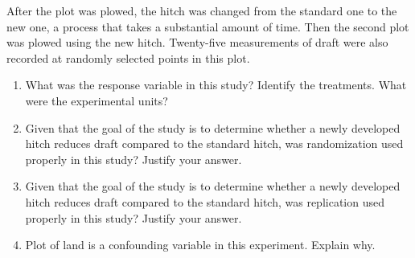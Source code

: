 \documentclass[a4paper,12pt,twoside]{book}
\begin{document}
\begin{enumerate}
After the plot was plowed, the hitch was changed from the standard one to the new one, a process that takes a substantial amount of time. Then the second plot was plowed using the new hitch. Twenty-five measurements of draft were also recorded at randomly selected points in this plot.

     \begin{enumerate}[label = (\alph*)]
        \item What was the response variable in this study? Identify the treatments. What were the experimental units?
        \item  Given that the goal of the study is to determine whether a newly developed hitch reduces draft compared to the standard hitch, was randomization used properly in this study? Justify your answer.
        \item Given that the goal of the study is to determine whether a newly developed hitch reduces draft compared to the standard hitch, was replication used properly in this study? Justify your answer.
        \item Plot of land is a confounding variable in this experiment. Explain why.
     \end{enumerate}
     \newpage
     

\end{enumerate}
\end{document}
